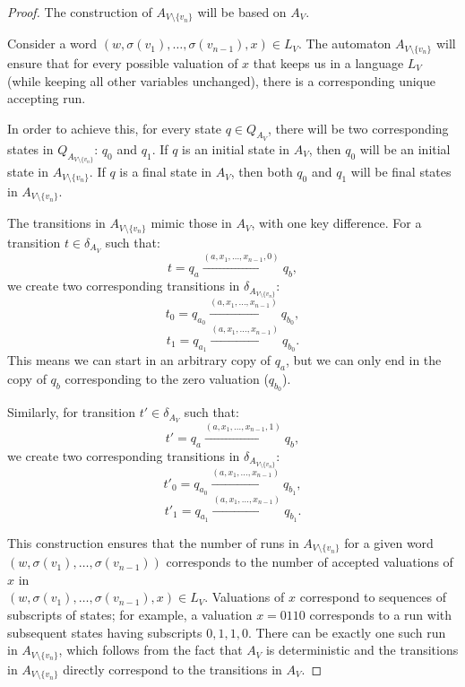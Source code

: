 \documentclass[en]{pracamgr}
\theoremstyle{definition}
\begin{document}
\begin{proof}
    The construction of $A_{V \setminus \{v_n\}}$ will be based on $A_V$.
    
    Consider a word $(w, \sigma(v_1), \ldots, \sigma(v_{n-1}), x) \in L_V$. The automaton $A_{V \setminus \{v_n\}}$ will ensure that for every possible valuation of $x$ that keeps us in a language $L_V$ (while keeping all other variables unchanged), there is a corresponding unique accepting run.

    In order to achieve this, for every state $q \in Q_{A_V}$, there will be two corresponding states in $Q_{A_{V \setminus \{v_n\}}}$: $q_0$ and $q_1$. If $q$ is an initial state in $A_V$, then $q_0$ will be an initial state in $A_{V \setminus \{v_n\}}$. If $q$ is a final state in $A_V$, then both $q_0$ and $q_1$ will be final states in $A_{V \setminus \{v_n\}}$.

    The transitions in $A_{V \setminus \{v_n\}}$ mimic those in $A_V$, with one key difference. For a transition $t \in \delta_{A_V}$ such that:
    $$t = q_a \xrightarrow{(a, x_1, \ldots, x_{n-1}, 0)} q_b,$$
    we create two corresponding transitions in $\delta_{A_{V \setminus \{v_n\}}}$:
    $$t_0 = q_{a_0} \xrightarrow{(a, x_1, \ldots, x_{n-1})} q_{b_0},$$
    $$t_1 = q_{a_1} \xrightarrow{(a, x_1, \ldots, x_{n-1})} q_{b_0}.$$
    This means we can start in an arbitrary copy of $q_a$, but we can only end in the copy of $q_b$ corresponding to the zero valuation ($q_{b_0}$). 

    Similarly, for transition $t' \in \delta_{A_V}$ such that:
    $$t' = q_a \xrightarrow{(a, x_1, \ldots, x_{n-1}, 1)} q_b,$$
    we create two corresponding transitions in $\delta_{A_{V \setminus \{v_n\}}}$:
    $$t'_0 = q_{a_0} \xrightarrow{(a, x_1, \ldots, x_{n-1})} q_{b_1},$$
    $$t'_1 = q_{a_1} \xrightarrow{(a, x_1, \ldots, x_{n-1})} q_{b_1}.$$

    This construction ensures that the number of runs in $A_{V \setminus \{v_n\}}$ for a given word \\ $(w, \sigma(v_1), \ldots, \sigma(v_{n-1}))$ corresponds to the number of accepted valuations of $x$ in  \\ $(w, \sigma(v_1), \ldots, \sigma(v_{n-1}), x) \in L_V$. Valuations of $x$ correspond to sequences of subscripts of states; for example, a valuation $x = 0110$ corresponds to a run with subsequent states having subscripts $0, 1, 1, 0$. There can be exactly one such run in $A_{V \setminus \{v_n\}}$, which follows from the fact that $A_V$ is deterministic and the transitions in $A_{V \setminus \{v_n\}}$ directly correspond to the transitions in $A_V$.
\end{proof}
\end{document}
